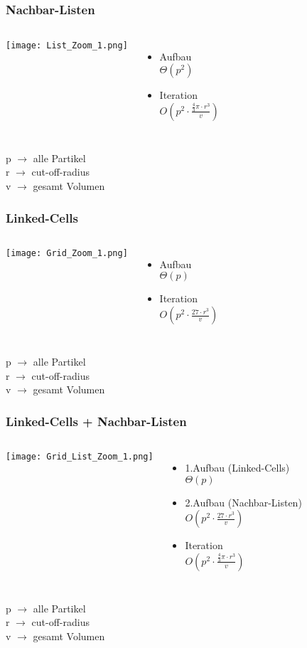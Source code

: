 \documentclass[compress]{beamer}
\begin{document}
\subsection{}
\begin{frame}
	\frametitle{Nachbar-Listen}
	\begin{columns}
		\centering
			\texttt{[image: List\_Zoom\_1.png]}
		\begin{itemize}
			\item Aufbau\\ $\Theta(p^2)$
			\item Iteration \\$O(p^2\cdot \frac{\frac{4}{3}\pi\cdot r^3}{v})$
		\end{itemize}
	\end{columns} 
p $\rightarrow$ alle Partikel\\
r $\rightarrow$ cut-off-radius \\
v $\rightarrow$ gesamt Volumen
\end{frame}
\begin{frame}
	\frametitle{Linked-Cells}
	\begin{columns}
		\column{0.6\linewidth}
		\centering
		\texttt{[image: Grid\_Zoom\_1.png]}
		\column{0.4\linewidth}
		\begin{itemize}
			\item Aufbau\\ $\Theta(p)$
			\item Iteration \\$O(p^2\cdot \frac{27 \cdot r^3}{v})$
		\end{itemize}
	\end{columns} 
p $\rightarrow$ alle Partikel\\
r $\rightarrow$ cut-off-radius \\
v $\rightarrow$ gesamt Volumen
\end{frame}
\begin{frame}
	\frametitle{Linked-Cells + Nachbar-Listen}
	\begin{columns}
		\centering
		\texttt{[image: Grid\_List\_Zoom\_1.png]}
		\begin{itemize}
			\item 1.Aufbau (Linked-Cells) \\ $\Theta(p)$
			\item 2.Aufbau (Nachbar-Listen) \\$O(p^2\cdot \frac{27 \cdot r^3}{v})$
			\item Iteration \\$O(p^2\cdot \frac{\frac{4}{3}\pi\cdot r^3}{v})$
		\end{itemize}
	\end{columns} 
p $\rightarrow$ alle Partikel\\
r $\rightarrow$ cut-off-radius \\
v $\rightarrow$ gesamt Volumen
\end{frame}
\end{document}

